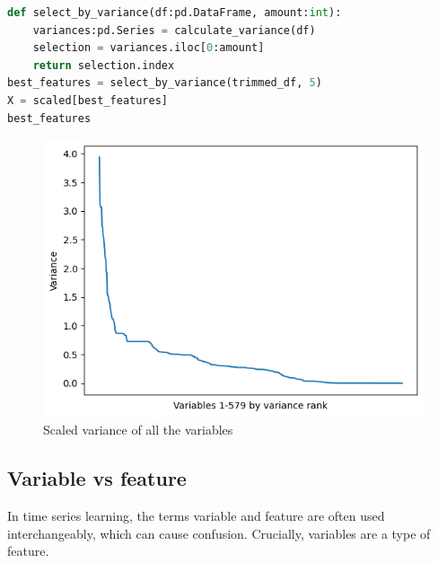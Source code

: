 \begin{lstlisting}[language=Python]
def select_by_variance(df:pd.DataFrame, amount:int):
    variances:pd.Series = calculate_variance(df)
    selection = variances.iloc[0:amount]
    return selection.index
best_features = select_by_variance(trimmed_df, 5)
X = scaled[best_features]
best_features
\end{lstlisting}



\begin{figure}[ht]
\centering 
\includegraphics[width=\columnwidth]{Figures/Graphs/Total_variance}
\caption{Scaled variance of all the variables}
\label{variance}
\end{figure}

\subsection{Variable vs feature}
In time series learning, the terms variable and feature are often used interchangeably, which can cause confusion. 
Crucially, variables are a type of feature. 